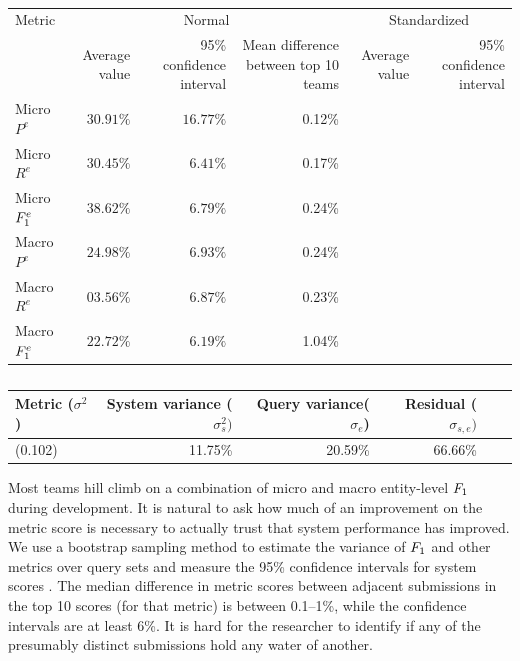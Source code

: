 \begin{table}
  \begin{tabular} {l r r r r r} \toprule
    Metric & \multicolumn{3}{c}{Normal} & \multicolumn{2}{c}{Standardized} \\
           & Average value & 95\% confidence interval & Mean difference between top 10 teams &  Average value & 95\% confidence interval  \\  \midrule 
Micro $P^e$     & $30.91\%$ &  $16.77\%$ & 0.12\% &     &  \\
Micro $R^e$     & $30.45\%$ &  $ 6.41\%$ & 0.17\% &     &  \\
Micro $F_1^e$ & $38.62\%$ &  $ 6.79\%$ & 0.24\% &     &  \\
Macro $P^e$     & $24.98\%$ &  $ 6.93\%$ & 0.24\% &     &  \\
Macro $R^e$     & $03.56\%$ &  $ 6.87\%$ & 0.23\% &     &  \\
Macro $F_1^e$ & $22.72\%$ &  $ 6.19\%$ & 1.04\% &     &  \\ \bottomrule
  \end{tabular}

\begin{tabular}{l r r r r r} \toprule
  Metric ($\sigma^2$) & System variance ($\sigma^2_{s}) $ & Query variance($\sigma_{e}$) & Residual ($\sigma_{s,e})$ \\ \midrule %
  \fone{} (0.102) & 11.75\% & 20.59\% & 66.66\% \\ \bottomrule %
\end{tabular}
  \caption{\label{metric-variance}}
\end{table}

Most teams hill climb on a combination of micro and macro entity-level $F_1$ during development.
It is natural to ask how much of an improvement on the metric score is necessary to actually trust that system performance has improved.
We use a bootstrap sampling  method to estimate the variance of $F_1$ and other metrics over query sets  and measure the 95\% confidence intervals for system scores .
The median difference in metric scores between adjacent submissions in the top 10 scores (for that metric) is between 0.1--1\%,
while the confidence intervals are at least 6\%.
It is hard for the researcher to identify if any of the presumably distinct submissions hold any water of another. 

